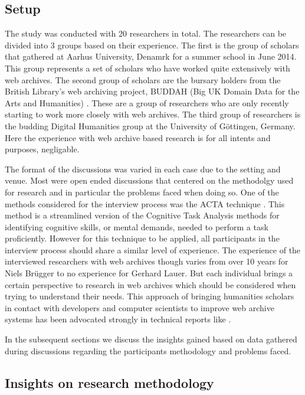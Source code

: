 \subsection{Setup} %
\label{sub:setup}

The study was conducted with 20 researchers in total. The researchers can be divided into 3 groups based on their experience. The first is the group of scholars that gathered at Aarhus University, Denamrk for a summer school in June 2014. This group represents a set of scholars who have worked quite extensively with web archives. The second group of scholars are the bursary holders from the British Library's web archiving project, BUDDAH (Big UK Domain Data for the Arts and Humanities) \cite{buddah}. These are a group of researchers who are only recently starting to work more closely with web archives. The third group of researchers is the budding Digital Humanities group at the University of Göttingen, Germany. Here the experience with web archive based research is for all intents and purposes, negligable. 

The format of the discussions was varied in each case due to the setting and venue. Most were open ended discussions that centered on the methodolgy used for research and in particular the problems faced when doing so. One of the methods considered for the interview process was the ACTA technique \cite{militello1998applied}. This method is a streamlined version of the Cognitive Task Analysis methods for identifying cognitive skills, or mental demands, needed to perform a task proficiently. However for this technique to be applied, all participants in the interview process should share a similar level of experience. The experience of the interviewed researchers with web archives though varies from over 10 years for Niels Br\"ugger to no experience for Gerhard Lauer. But each individual brings a certain perspective to research in web archives which should be considered when trying to understand their needs.
This approach of bringing humanities scholars in contact with developers and computer scientists to improve web archive systems has been advocated strongly in technical reports like \cite{dougherty2010researcher}. 

In the subsequent sections we discuss the insights gained based on data gathered during discussions regarding the participants methodology and problems faced.

\subsection{Insights on research methodology} %
\label{sub:data}

